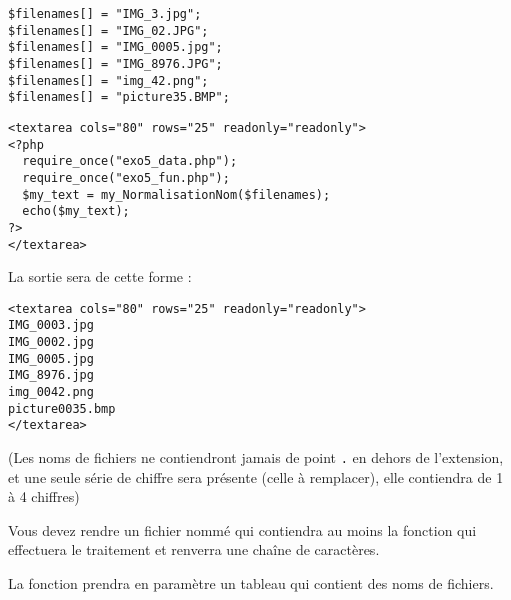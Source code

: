 \lstset{language=php}
\begin{lstlisting}[frame=single,title={Exemple de tableau en entrée (exo5\_data.php)}]
$filenames[] = "IMG_3.jpg";
$filenames[] = "IMG_02.JPG";
$filenames[] = "IMG_0005.jpg";
$filenames[] = "IMG_8976.JPG";
$filenames[] = "img_42.png";
$filenames[] = "picture35.BMP";
\end{lstlisting}

\lstset{language=php}
\begin{lstlisting}[frame=single,title={Appel de la fonction}]
<textarea cols="80" rows="25" readonly="readonly">
<?php
  require_once("exo5_data.php");
  require_once("exo5_fun.php");
  $my_text = my_NormalisationNom($filenames);
  echo($my_text);
?>
</textarea>
\end{lstlisting}

%
%

\bigskip

\noindent La sortie sera de cette forme :\\

\lstset{language=php}
\begin{lstlisting}[frame=single,title={Sortie HTML attendue}]
<textarea cols="80" rows="25" readonly="readonly">
IMG_0003.jpg
IMG_0002.jpg
IMG_0005.jpg
IMG_8976.jpg
img_0042.png
picture0035.bmp
</textarea>
\end{lstlisting}

\bigskip

\noindent (Les noms de fichiers ne contiendront jamais de point \texttt{.} en dehors de l'extension, et une seule série de chiffre sera présente (celle à remplacer), elle contiendra de 1 à 4 chiffres)

\bigskip

\noindent Vous devez rendre un fichier nommé  qui contiendra au moins la fonction  qui effectuera le traitement et renverra une chaîne de caractères.

\noindent La fonction prendra en paramètre un tableau qui contient des noms de fichiers.

